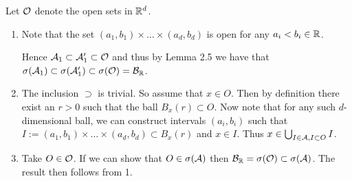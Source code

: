 Let $\mathcal O$ denote the open sets in $\mathbb R^d$.
\begin{enumerate}[label=(\alph*)]
\item {}


Note that the set $(a_1,b_1) \times \dots \times (a_d, b_d)$ is open for any $a_i < b_i \in \mathbb R$.

 Hence $\mathcal A_1 \subset \mathcal A_1^\prime \subset \mathcal O$ and thus by Lemma 2.5 we have that $\sigma(\mathcal A_1) \subset \sigma(\mathcal A_1^\prime) \subset \sigma(\mathcal O) = \mathcal B_{\mathbb R}$.
\item {}

The inclusion $\supset$ is trivial. So assume that $x \in O$. Then by definition there exist an $r > 0$ such that the ball $B_x(r) \subset O$. Now note that for any such $d$-dimensional ball, we can construct intervals $(a_i,b_i)$ such that $I := (a_1,b_1) \times \dots \times (a_d, b_d) \subset B_x(r)$ and $x \in I$. Thus $x \in \bigcup_{I \in \mathcal A, I \subset O} I$.
\item {}

Take $O \in \mathcal O$. If we can show that $O \in \sigma(\mathcal A)$ then $\mathcal B_{\mathbb R} = \sigma(\mathcal O) \subset \sigma(\mathcal A)$. The result then follows from 1. 


\end{enumerate}
